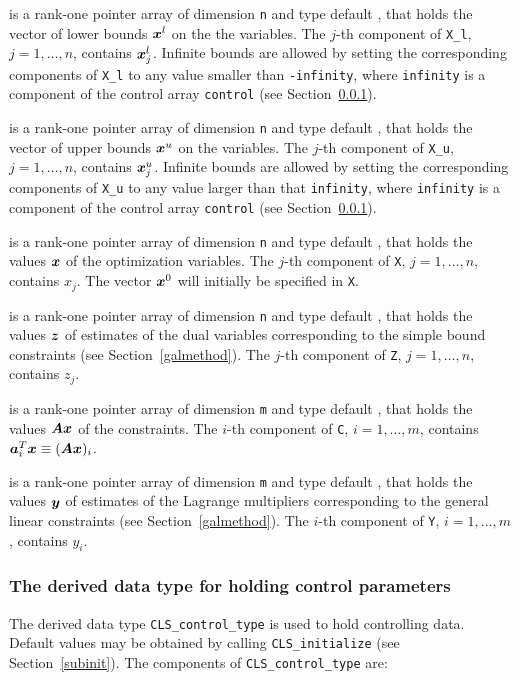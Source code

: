 \documentclass{galahad}
\newcommand{\packagename}{CLS}
\begin{document}
\begin{description}
 is a rank-one pointer array of dimension {\tt n} and type 
default \realdp, that holds
the vector of lower bounds ${\bm{x}}^{l}$ on the the variables.
The $j$-th component of {\tt X\_l}, $j = 1, \ldots , n$, 
contains ${\bm{x}}_{j}^{l}$.
Infinite bounds are allowed by setting the corresponding 
components of {\tt X\_l} to any value smaller than {\tt -infinity}, 
where {\tt infinity} is a component of the control array {\tt control} 
(see Section~\ref{typecontrol}).

 is a rank-one pointer array of dimension {\tt n} and type 
default \realdp, that holds
the vector of upper bounds ${\bm{x}}^{u}$ on the variables.
The $j$-th component of {\tt X\_u}, $j = 1, \ldots , n$, 
contains ${\bm{x}}_{j}^{u}$.
Infinite bounds are allowed by setting the corresponding 
components of {\tt X\_u} to any value larger than that {\tt infinity}, 
where {\tt infinity} is a component of the control array {\tt control} 
(see Section~\ref{typecontrol}).

 is a rank-one pointer array of dimension {\tt n} and type 
default \realdp, 
that holds the values ${\bm{x}}$ of the optimization variables.
The $j$-th component of {\tt X}, $j = 1,  \ldots , n$, contains $x_{j}$.  
The vector ${\bm{x}}^{0}$ will initially be specified in {\tt X}.

 is a rank-one pointer array of dimension {\tt n} and type default 
\realdp, that holds
the values ${\bm{z}}$ of estimates  of the dual variables 
corresponding to the simple bound constraints (see Section~\ref{galmethod}).
The $j$-th component of {\tt Z}, $j = 1,  \ldots ,  n$, contains $z_{j}$.  

 is a rank-one pointer array of dimension {\tt m} and type default 
\realdp, that holds
the values ${\bm{A}} {\bm{x}}$ of the constraints.
The $i$-th component of {\tt C}, $i = 1,  \ldots ,  m$, contains 
${\bm{a}}_{i}^{T}{\bm{x}} \equiv ({\bm{A}} {\bm{x}})_{i}$.  

 is a rank-one pointer array of dimension {\tt m} and type 
default \realdp, that holds
the values ${\bm{y}}$ of estimates  of the Lagrange multipliers
corresponding to the general linear constraints (see Section~\ref{galmethod}).
The $i$-th component of {\tt Y}, $i = 1,  \ldots ,  m$, contains $y_{i}$.  

\end{description}


\subsubsection{The derived data type for holding control 
 parameters}\label{typecontrol}
The derived data type 
{\tt \packagename\_control\_type} 
is used to hold controlling data. Default values may be obtained by calling 
{\tt \packagename\_initialize}
(see Section~\ref{subinit}). The components of 
{\tt \packagename\_control\_type} 
are:
\end{document}
